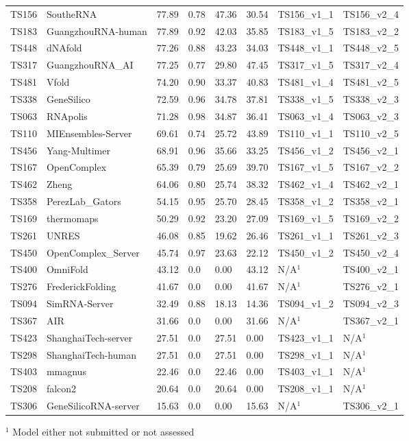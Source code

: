 \begin{table}[ht]
{\begin{tabular}{llllllll}
TS156 & SoutheRNA & 77.89 & 0.78 & 47.36 & 30.54 & TS156\_v1\_1 & TS156\_v2\_4 \\ 
TS183 & GuangzhouRNA-human & 77.89 & 0.92 & 42.03 & 35.85 & TS183\_v1\_5 & TS183\_v2\_2 \\ 
TS448 & dNAfold & 77.26 & 0.88 & 43.23 & 34.03 & TS448\_v1\_1 & TS448\_v2\_5 \\ 
TS317 & GuangzhouRNA\_AI & 77.25 & 0.77 & 29.80 & 47.45 & TS317\_v1\_5 & TS317\_v2\_4 \\ 
TS481 & Vfold & 74.20 & 0.90 & 33.37 & 40.83 & TS481\_v1\_4 & TS481\_v2\_5 \\ 
TS338 & GeneSilico & 72.59 & 0.96 & 34.78 & 37.81 & TS338\_v1\_5 & TS338\_v2\_3 \\ 
TS063 & RNApolis & 71.28 & 0.98 & 34.87 & 36.41 & TS063\_v1\_4 & TS063\_v2\_3 \\ 
TS110 & MIEnsembles-Server & 69.61 & 0.74 & 25.72 & 43.89 & TS110\_v1\_1 & TS110\_v2\_5 \\ 
TS456 & Yang-Multimer & 68.91 & 0.96 & 35.66 & 33.25 & TS456\_v1\_2 & TS456\_v2\_1 \\ 
TS167 & OpenComplex & 65.39 & 0.79 & 25.69 & 39.70 & TS167\_v1\_5 & TS167\_v2\_2 \\ 
TS462 & Zheng & 64.06 & 0.80 & 25.74 & 38.32 & TS462\_v1\_4 & TS462\_v2\_1 \\ 
TS358 & PerezLab\_Gators & 54.15 & 0.95 & 25.70 & 28.45 & TS358\_v1\_2 & TS358\_v2\_1 \\ 
TS169 & thermomaps & 50.29 & 0.92 & 23.20 & 27.09 & TS169\_v1\_5 & TS169\_v2\_2 \\ 
TS261 & UNRES & 46.08 & 0.85 & 19.62 & 26.46 & TS261\_v1\_1 & TS261\_v2\_3 \\ 
TS450 & OpenComplex\_Server & 45.74 & 0.97 & 23.63 & 22.12 & TS450\_v1\_2 & TS450\_v2\_4 \\ 
TS400 & OmniFold & 43.12 & 0.0 & 0.00 & 43.12 & N/A$^{1}$ & TS400\_v2\_1 \\ 
TS276 & FrederickFolding & 41.67 & 0.0 & 0.00 & 41.67 & N/A$^{1}$ & TS276\_v2\_1 \\ 
TS094 & SimRNA-Server & 32.49 & 0.88 & 18.13 & 14.36 & TS094\_v1\_2 & TS094\_v2\_3 \\ 
TS367 & AIR & 31.66 & 0.0 & 0.00 & 31.66 & N/A$^{1}$ & TS367\_v2\_1 \\ 
TS423 & ShanghaiTech-server & 27.51 & 0.0 & 27.51 & 0.00 & TS423\_v1\_1 & N/A$^{1}$ \\ 
TS298 & ShanghaiTech-human & 27.51 & 0.0 & 27.51 & 0.00 & TS298\_v1\_1 & N/A$^{1}$ \\ 
TS403 & mmagnus & 22.46 & 0.0 & 22.46 & 0.00 & TS403\_v1\_1 & N/A$^{1}$ \\ 
TS208 & falcon2 & 20.64 & 0.0 & 20.64 & 0.00 & TS208\_v1\_1 & N/A$^{1}$ \\ 
TS306 & GeneSilicoRNA-server & 15.63 & 0.0 & 0.00 & 15.63 & N/A$^{1}$ & TS306\_v2\_1 \\ 
\bottomrule
\end{tabular}%
}
\begin{flushleft}\footnotesize $^{1}$ Model either not submitted or not assessed\end{flushleft}
\end{table}
